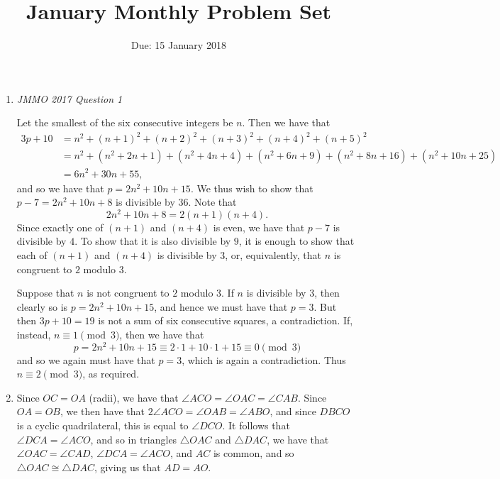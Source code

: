 \documentclass[12pt]{article}
\title{January Monthly Problem Set}
\author{Due: 15 January 2018}
\date{}
\begin{document}
 \maketitle

\begin{enumerate}

\item \textit{JMMO 2017 Question 1}

Let the smallest of the six consecutive integers be $n$. Then we have that
\begin{align*}
    3p + 10 & = n^2 + (n + 1)^2 + (n + 2)^2 + (n + 3)^2 + (n + 4)^2 + (n + 5)^2
    \\
    & = n^2 + (n^2 + 2n + 1) + (n^2 + 4n + 4) + (n^2 + 6n + 9) + (n^2 + 8n + 16)
    + (n^2 + 10n + 25) \\
    & = 6n^2 + 30n + 55,
\end{align*}
and so we have that $p = 2n^2 + 10n + 15$. We thus wish to show that $p - 7 =
2n^2 + 10n + 8$ is divisible by $36$. Note that
\[
    2n^2 + 10n + 8 = 2(n + 1)(n + 4).
\]
Since exactly one of $(n + 1)$ and $(n + 4)$ is even, we have that $p - 7$ is
divisible by $4$. To show that it is also divisible by $9$, it is enough to show
that each of $(n + 1)$ and $(n + 4)$ is divisible by $3$, or, equivalently, that
$n$ is congruent to $2$ modulo $3$. 
        
Suppose that $n$ is not congruent to $2$ modulo $3$. If $n$ is divisible by $3$,
then clearly so is $p = 2n^2 + 10n + 15$, and hence we must have that $p = 3$.
But then $3p + 10 = 19$ is not a sum of six consecutive squares, a
contradiction. If, instead, $n \equiv 1 \pmod 3$, then we have that
\[
    p = 2n^2 + 10n + 15 \equiv 2 \cdot 1 + 10 \cdot 1 + 15 \equiv 0 \pmod 3
\]
and so we again must have that $p = 3$, which is again a contradiction. Thus $n
\equiv 2 \pmod 3$, as required.
        

 
\item %
Since $OC = OA$ (radii), we have that $\angle ACO = \angle OAC = \angle CAB$.
Since $OA = OB$, we then have that $2\angle ACO = \angle OAB = \angle ABO$, and
since $DBCO$ is a cyclic quadrilateral, this is equal to $\angle DCO$. It
follows that $\angle DCA = \angle ACO$, and so in triangles $\triangle OAC$ and
$\triangle DAC$, we have that $\angle OAC = \angle CAD$, $\angle DCA = \angle
ACO$, and $AC$ is common, and so $\triangle OAC \cong \triangle DAC$, giving us
that $AD = AO$.


\end{enumerate}
\end{document}

